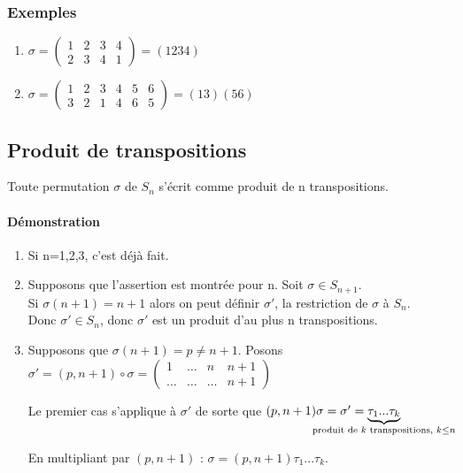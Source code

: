 \documentclass[a4paper,10pt]{book} %
\begin{document}
\subsubsection{Exemples}
\begin{enumerate}
\item $\sigma=\begin{pmatrix}
1&2&3&4\\
2&3&4&1
\end{pmatrix}=(1234)$

\item $\sigma=\begin{pmatrix}
1&2&3&4&5&6\\
3&2&1&4&6&5
\end{pmatrix}=(13)(56)$
\end{enumerate}

\newpage

\subsection{Produit de transpositions}
Toute permutation $\sigma$ de $S_n$ s'écrit comme produit de n transpositions.

\paragraph{Démonstration}
\begin{enumerate}
\item Si n=1,2,3, c'est déjà fait.
\item 
Supposons que l'assertion est montrée pour n. Soit $\sigma\in S_{n+1}$.\\

Si $\sigma(n+1)=n+1$ alors on peut définir $\sigma'$, la restriction de $\sigma$ à $S_n$.\\ Donc $\sigma'\in S_n$, donc $\sigma'$ est un produit d'au plus n transpositions.

\item Supposons que $\sigma(n+1)=p\neq n+1$.
Posons $\sigma'=(p,n+1)\circ \sigma=\begin{pmatrix}
1&\dots&n&n+1\\
\dots &\dots & \dots & n+1
\end{pmatrix}$

Le premier cas s'applique à $\sigma'$ de sorte que $(p,n+1)\sigma=\sigma'=\underset{\mathclap{\text{produit de }k\text{ transpositions, }k\leq n}}{\underbrace{\tau_1...\tau_k}}$

En multipliant par $(p,n+1)$ : $\sigma=(p,n+1)\tau_1...\tau_k$.
\end{enumerate}
\end{document}
